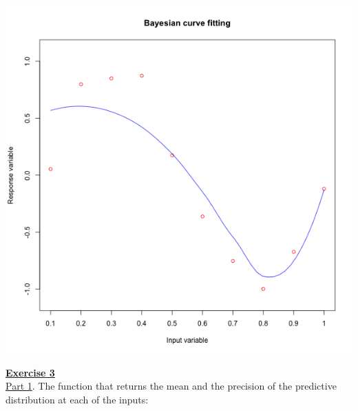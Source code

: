 \documentclass[a4paper, 11pt]{article}\usepackage[]{graphicx}\usepackage[]{color}
\begin{document}
\begin{center}
\includegraphics[scale = 0.5]{ps2_plot2.png}
\end{center}
\newpage
\textbf{\underline{Exercise 3}}\\
\underline{Part 1}. The function that returns the mean and the precision of the predictive distribution at each of the inputs:
\end{document}
